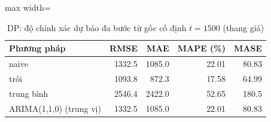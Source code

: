\begin{table}[H]
\centering\footnotesize
\caption{DP: độ chính xác dự báo đa bước từ gốc cố định $t=1500$ (thang giá)}\label{tab:tab_b12_11_dp_multistep}
\begin{adjustbox}{max width=\linewidth}
\begin{tabular}{|l|r|r|r|r|}
\toprule
Phương pháp & RMSE & MAE & MAPE (\%) & MASE \\
\midrule
naive & 1332.5 & 1085.0 & 22.01 & 80.83 \\
trôi & 1093.8 & 872.3 & 17.58 & 64.99 \\
trung bình & 2546.4 & 2422.0 & 52.65 & 180.5 \\
ARIMA(1,1,0) (trung vị) & 1332.5 & 1085.0 & 22.01 & 80.83 \\
\bottomrule
\end{tabular}
\end{adjustbox}
\end{table}
